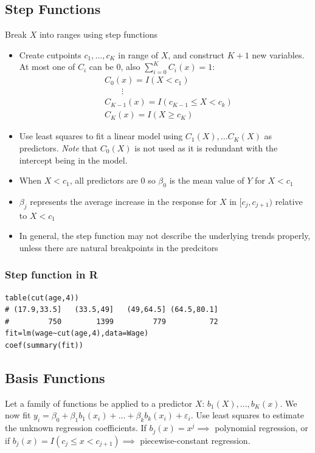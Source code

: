 \documentclass[11pt]{article}
\begin{document}
\subsection{Step Functions}
\noindent Break $X$ into ranges using step functions
\begin{itemize}
    \item Create cutpoints $c_1,...,c_K$ in range of $X$, and construct $K+1$ new variables. At most one of $C_i$ can be $0$, also $\sum_{i=0}^{K}C_i(x) = 1$:
        \begin{align*}
            &C_0(x) = I(X < c_1) \\
            & \quad \quad \vdots \\
            &C_{K-1}(x) = I(c_{K-1} \leq X < c_k) \\
            &C_K(x) = I(X \geq c_K)
        \end{align*}
    \item Use least squares to fit a linear model using $C_1(X),...C_K(X)$ as predictors. \textit{Note} that $C_0(X)$ is not used as it is redundant with the intercept being in the model.
    \item When $X < c_1$, all predictors are $0$ so $\beta_0$ is the mean value of $Y$ for $X < c_1$
    \item $\beta_j$ represents the average increase in the response for $X$ in $[c_j, c_{j+1})$ relative to $X < c_1$
    \item In general, the step function may not describe the underlying trends properly, unless there are natural breakpoints in the predcitors
\end{itemize}

\subsubsection{Step function in R}
\begin{lstlisting}
table(cut(age,4))
# (17.9,33.5]   (33.5,49]   (49,64.5] (64.5,80.1] 
#         750        1399         779          72 
fit=lm(wage~cut(age,4),data=Wage)
coef(summary(fit))
\end{lstlisting}

\subsection{Basis Functions}
\noindent Let a family of functions be applied to a predictor $X$: $b_1(X),...,b_K(x)$. We now fit $y_i = \beta_0 + \beta_1b_1(x_i)+...+\beta_kb_k(x_i) + \varepsilon_i$. Use least squares to estimate the unknown regression coefficients. If $b_j(x) = x^j \implies$ polynomial regression, or if $b_j(x) = I(c_j \leq x < c_{j+1}) \implies $ piecewise-constant regression.
\end{document}
